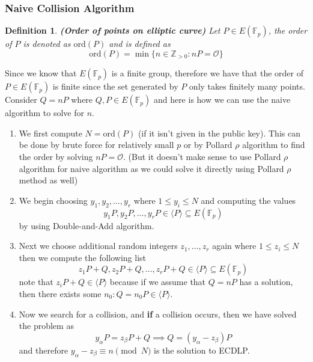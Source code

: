 \documentclass[a4 paper]{article}
\newcommand{\?}{\stackrel{?}{=}}
\newtheorem{definition}{Definition}[section]
\begin{document}
\subsubsection{Naive Collision Algorithm}
\begin{Definition}
\begin{definition}
\textbf{(Order of points on elliptic curve)} Let $ P \in E(\mathbb{F}_p) $, the order of $ P $ is denoted as $ \text{ord}(P) $ and is defined as 
$$ \text{ord}(P) = \min \{n \in \mathbb{Z}_{>0} : nP = \mathcal{O} \} $$
\end{definition}
\end{Definition}
Since we know that $ E(\mathbb{F}_p) $ is a finite group, therefore we have that the order of $ P \in E(\mathbb{F}_p) $ is finite since the set generated by $ P $ only takes finitely many points. Consider $ Q = n P  $ where $ Q , P \in E(\mathbb{F}_p) $ and here is how we can use the naive algorithm to solve for $ n $. 
\begin{enumerate}
    \item We first compute $ N = \text{ord}(P) $ (if it isn't given in the public key). This can be done by brute force for relatively small $ p $ or by Pollard $ \rho $ algorithm to find the order by solving $ nP =\mathcal{O}$. (But it doesn't make sense to use Pollard $ \rho $ algorithm  for naive algorithm as we could solve it directly using Pollard $ \rho $ method as well) 
    \item We begin choosing $ y_1 , y_2 , \dots, y_r $ where $1 \leq y_i \leq N $ and computing the values 
    $$ y_1 P , y_2 P , \dots, y_r P \in \langle P    \rangle \subseteq E(\mathbb{F}_p ) $$
    by using Double-and-Add algorithm. 
    \item Next we choose additional random integers $ z_1 ,\dots, z_r $ again where $ 1 \leq z_i \leq N   $ then we compute the following list 
    $$ z_1 P + Q , z_2 P + Q , \dots, z_r P + Q \in \langle P    \rangle \subseteq E(\mathbb{F}_p) $$
    note that $ z_i P  + Q \in \langle P \rangle $ because if we assume that $ Q = nP $ has a solution, then there exists some $ n_0  : Q = n_0 P \in \langle P \rangle $. 
    \item Now we search for a collision, and \textbf{if} a collision occurs, then we have solved the problem as 
    $$ y_\alpha P = z_\beta P + Q \implies Q  = (y_\alpha - z_\beta)P $$ 
    and therefore $ y_\alpha - z_\beta \equiv n \pmod N $ is the solution to ECDLP.
\end{enumerate}
\end{document}
